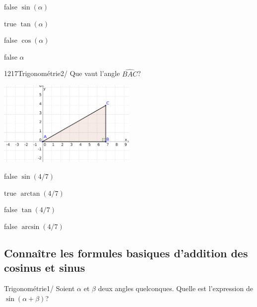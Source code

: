 \documentclass[11pt]{article}
\begin{document}
            \begin{reponses}
            	\item[false] $\sin(\alpha)$
                \item[true] $\tan(\alpha)$
                \item[false] $\cos(\alpha)$
            	\item[false] $\alpha$
            \end{reponses}

            \begin{question}{1217}{Trigonométrie}{2}{/}
                Que vaut l'angle $\hat{BAC}$?
                \begin{center}
                	\includegraphics[width=0.5\textwidth]{Philippe/Figures_Philippe/trigo_1_1.png}
                \end{center}
            \end{question}

            \begin{reponses}
                \item[false] $\sin(4/7)$
                \item[true] $\arctan(4/7)$
                \item[false] $\tan(4/7)$
                \item[false] $\arcsin(4/7)$
            \end{reponses}
        
		\subsection{Connaître les formules basiques d’addition des cosinus et sinus}
        
        	\begin{question}{47}{Trigonométrie}{1}{/}
				Soient $\alpha$ et $\beta$ deux angles quelconques. Quelle est l'expression de $\sin(\alpha+\beta)$?
            \end{question}
\end{document}
